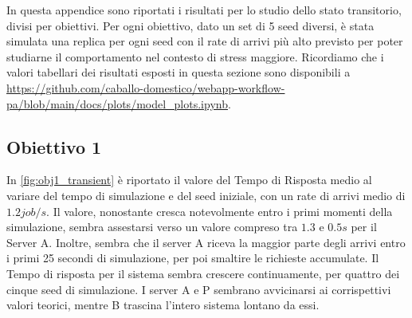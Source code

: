 In questa appendice sono riportati i risultati per lo studio dello stato transitorio, divisi per obiettivi. Per ogni obiettivo, dato un set di 5 seed diversi, è stata simulata una replica per ogni seed con il rate di arrivi più alto previsto per poter studiarne il comportamento nel contesto di stress maggiore. Ricordiamo che i valori tabellari dei risultati esposti in questa sezione sono disponibili a \url{https://github.com/caballo-domestico/webapp-workflow-pa/blob/main/docs/plots/model_plots.ipynb}.

\subsection{Obiettivo 1}

In \autoref{fig:obj1_transient} è riportato il valore del Tempo di Risposta medio al variare del tempo di simulazione e del seed iniziale, con un rate di arrivi medio di $1.2 job/s$. Il valore, nonostante cresca notevolmente entro i primi momenti della simulazione, sembra assestarsi verso un valore compreso tra $1.3$ e $0.5s$ per il Server A. Inoltre, sembra che il server A riceva la maggior parte degli arrivi entro i primi 25 secondi di simulazione, per poi smaltire le richieste accumulate. Il Tempo di risposta per il sistema sembra crescere continuamente, per quattro dei cinque seed di simulazione. I server A e P sembrano avvicinarsi ai corrispettivi valori teorici, mentre B trascina l'intero sistema lontano da essi.

